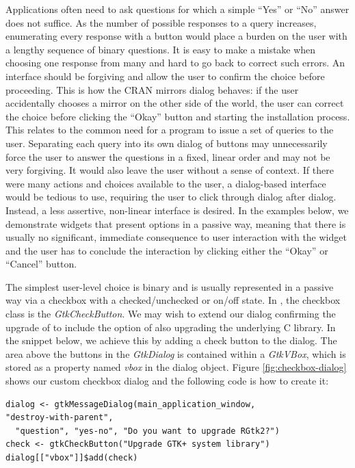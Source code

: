 \documentclass[article]{jss}
\begin{document}
Applications often need to ask questions for which a simple ``Yes'' or
``No'' answer does not suffice. As the number of possible responses to
a query increases, enumerating every response with a button would
place a burden on the user with a lengthy sequence of binary
questions.  It is easy to make a mistake when choosing one response
from many and hard to go back to correct such errors. An interface
should be forgiving and allow the user to confirm the choice before
proceeding.  This is how the CRAN mirrors dialog behaves: if the user
accidentally chooses a mirror on the other side of the world, the user
can correct the choice before clicking the ``Okay'' button and
starting the installation process. This relates to the common need for
a program to issue a set of queries to the user. Separating each query
into its own dialog of buttons may unnecessarily force the user to
answer the questions in a fixed, linear order and may not be very
forgiving. It would also leave the user without a sense of context. If
there were many actions and choices available to the user, a
dialog-based interface would be tedious to use, requiring the user to
click through dialog after dialog. Instead, a less assertive,
non-linear interface is desired. In the examples below, we demonstrate
widgets that present options in a passive way, meaning that there is
usually no significant, immediate consequence to user interaction with
the widget and the user has to conclude the interaction by clicking
either the ``Okay'' or ``Cancel'' button.

The simplest user-level choice is binary and is usually represented in
a passive way via a checkbox with a checked/unchecked or  on/off 
state. In , the checkbox class is the
\emph{GtkCheckButton}. We may wish to extend our dialog confirming the
upgrade of  to include the option of also upgrading the
underlying  C library. In the snippet below, we achieve this by adding a
check button to the dialog.  The area above the buttons in the
\emph{GtkDialog} is contained within a \emph{GtkVBox}, which is stored
as a property named \emph{vbox} in the dialog object. Figure \ref{fig:checkbox-dialog} shows
our custom checkbox dialog and the following code is how to create it:
\begin{verbatim}
dialog <- gtkMessageDialog(main_application_window,
"destroy-with-parent", 
  "question", "yes-no", "Do you want to upgrade RGtk2?")
check <- gtkCheckButton("Upgrade GTK+ system library")
dialog[["vbox"]]$add(check)
\end{verbatim}
\end{document}
